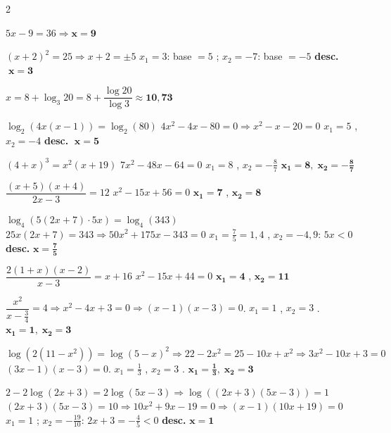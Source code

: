\documentclass[12pt,a4paper]{article}
\begin{document}
\begin{multicols}{2}
\begin{exercicis}
    \item $5x-9=36\Rightarrow\boldsymbol{x=9}$ \checkmark
    \item $(x+2)^2=25\Rightarrow x+2=\pm5$ \newline $x_1=3$: base $=5$ \checkmark; $x_2=-7$: base $=-5$ \textbf{desc.} $\;\boldsymbol{x=3}$
    \item $x=8+\log_3 20=8+\dfrac{\log20}{\log3}\approx\boldsymbol{10{,}73}$
    \item $\log_2(4x(x-1))=\log_2(80)$ \newline $4x^2-4x-80=0\Rightarrow x^2-x-20=0$ \newline $x_1=5$ \checkmark, $x_2=-4$ \textbf{desc.} $\;\boldsymbol{x=5}$
    \item $(4+x)^3=x^2(x+19)$ \newline $7x^2-48x-64=0$ \newline $x_1=8$ \checkmark, $x_2=-\tfrac{8}{7}$ \checkmark \newline $\boldsymbol{x_1=8,\;x_2=-\tfrac{8}{7}}$
    \item $\dfrac{(x+5)(x+4)}{2x-3}=12$ \newline $x^2-15x+56=0$ \newline $\boldsymbol{x_1=7}$ \checkmark, $\boldsymbol{x_2=8}$ \checkmark
    \item $\log_4(5(2x+7)\cdot5x)=\log_4(343)$ \newline $25x(2x+7)=343\Rightarrow50x^2+175x-343=0$ \newline $x_1=\tfrac{7}{5}=1{,}4$ \checkmark, $x_2=-4{,}9$: $5x<0$ \textbf{desc.} \newline $\boldsymbol{x=\tfrac{7}{5}}$
    \item $\dfrac{2(1+x)(x-2)}{x-3}=x+16$ \newline $x^2-15x+44=0$ \newline $\boldsymbol{x_1=4}$ \checkmark, $\boldsymbol{x_2=11}$ \checkmark
    \item $\dfrac{x^2}{x-\frac{3}{4}}=4\Rightarrow x^2-4x+3=0\Rightarrow(x-1)(x-3)=0$. \quad $x_1=1$ \checkmark, $x_2=3$ \checkmark. \quad $\boldsymbol{x_1=1,\;x_2=3}$

    \item $\log(2(11-x^2))=\log(5-x)^2\Rightarrow22-2x^2=25-10x+x^2\Rightarrow3x^2-10x+3=0$ \newline $(3x-1)(x-3)=0$. \quad $x_1=\tfrac{1}{3}$ \checkmark, $x_2=3$ \checkmark. \quad $\boldsymbol{x_1=\tfrac{1}{3},\;x_2=3}$

    \item $2-2\log(2x+3)=2\log(5x-3)\Rightarrow\log((2x+3)(5x-3))=1$ \newline $(2x+3)(5x-3)=10\Rightarrow10x^2+9x-19=0\Rightarrow(x-1)(10x+19)=0$ \newline $x_1=1$ \checkmark; $x_2=-\tfrac{19}{10}$: $2x+3=-\tfrac{4}{5}<0$ \textbf{desc.} \quad $\boldsymbol{x=1}$
\end{exercicis}
\end{multicols}

\vspace{0.3cm}
\end{document}

